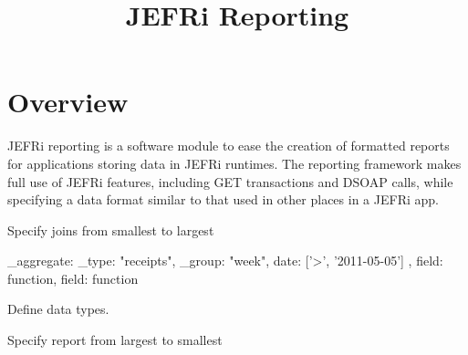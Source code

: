 \documentclass{article}
\begin{document}
\title{JEFRi Reporting}
\maketitle
\tableofcontents
\newpage
\linespread{1.6}

\section{Overview}
JEFRi reporting is a software module to ease the creation of formatted reports
for applications storing data in JEFRi runtimes. The reporting framework makes
full use of JEFRi features, including GET transactions and DSOAP calls, while
specifying a data format similar to that used in other places in a JEFRi app.

Specify joins from smallest to largest

{
	_aggregate: {
		_type: "receipts",
		_group: "week",
		date: ['>', '2011-05-05']
	},
	field: function,
	field: function
}

Define data types.


Specify report from largest to smallest
\end{document}
